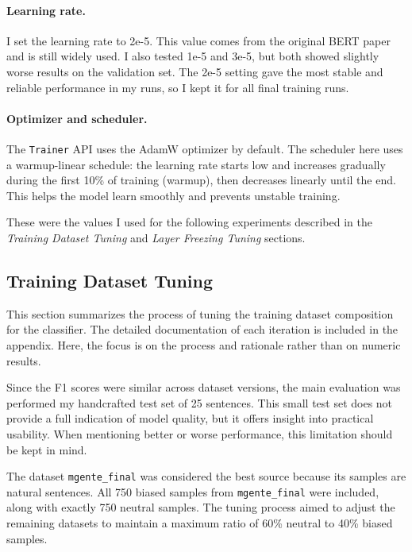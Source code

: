     \paragraph{Learning rate.} I set the learning rate to 2e-5. This value comes from the original BERT paper \parencite{devlinBERTPretrainingDeep2019} and is still widely used. I also tested 1e-5 and 3e-5, but both showed slightly worse results on the validation set. The 2e-5 setting gave the most stable and reliable performance in my runs, so I kept it for all final training runs.

    \paragraph{Optimizer and scheduler.} The \texttt{Trainer} API uses the AdamW optimizer by default. The scheduler here uses a warmup-linear schedule: the learning rate starts low and increases gradually during the first 10\% of training (warmup), then decreases linearly until the end. This helps the model learn smoothly and prevents unstable training.

    These were the values I used for the following experiments described in the \textit{Training Dataset Tuning} and \textit{Layer Freezing Tuning} sections.

\subsection{Training Dataset Tuning} \label{subsection:training_dataset_tuning}
    This section summarizes the process of tuning the training dataset composition for the classifier. The detailed documentation of each iteration is included in the appendix. Here, the focus is on the process and rationale rather than on numeric results.

    Since the F1 scores were similar across dataset versions, the main evaluation was performed my handcrafted test set of 25 sentences. This small test set does not provide a full indication of model quality, but it offers insight into practical usability. When mentioning better or worse performance, this limitation should be kept in mind.

    The dataset \texttt{mgente\_final} was considered the best source because its samples are natural sentences. All 750 biased samples from \texttt{mgente\_final} were included, along with exactly 750 neutral samples. The tuning process aimed to adjust the remaining datasets to maintain a maximum ratio of 60\% neutral to 40\% biased samples.

